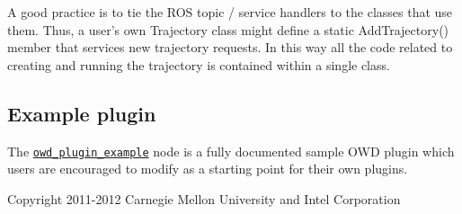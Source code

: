 A good practice is to tie the R\-O\-S topic / service handlers to the classes that use them. Thus, a user's own Trajectory class might define a static Add\-Trajectory() member that services new trajectory requests. In this way all the code related to creating and running the trajectory is contained within a single class.\hypertarget{plugins_plugin_examples}{}\subsection{Example plugin}\label{plugins_plugin_examples}
The \href{http://personalrobotics.ri.cmu.edu/intel-pkg/owd_plugin_example/html/index.html}{\tt owd\-\_\-plugin\-\_\-example} node is a fully documented sample O\-W\-D plugin which users are encouraged to modify as a starting point for their own plugins.

\begin{DoxyVerb}Copyright 2011-2012 Carnegie Mellon University and Intel Corporation
\end{DoxyVerb}
 